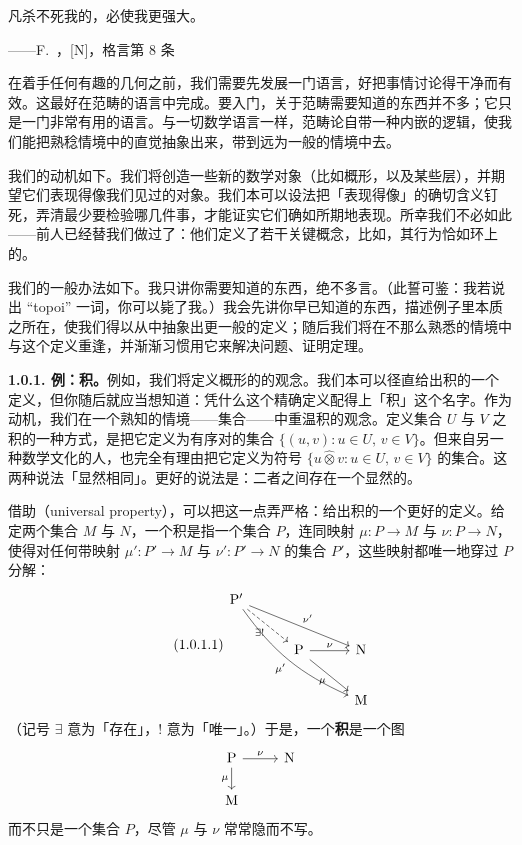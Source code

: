 \epigraph
  {凡杀不死我的，必使我更强大。}
  {——F.~\trNietzsche，[N]，格言第 8 条}

在着手任何有趣的几何之前，我们需要先发展一门语言，好把事情讨论得干净而有效。这最好在范畴的语言中完成。要入门，关于范畴需要知道的东西并不多；它只是一门非常有用的语言。与一切数学语言一样，范畴论自带一种内嵌的逻辑，使我们能把熟稔情境中的直觉抽象出来，带到远为一般的情境中去。

我们的动机如下。我们将创造一些新的数学对象（比如概形，以及某些层），并期望它们表现得像我们见过的对象。我们本可以设法把「表现得像」的确切含义钉死，弄清最少要检验哪几件事，才能证实它们确如所期地表现。所幸我们不必如此——前人已经替我们做过了：他们定义了若干关键概念，比如\trAbelianCategory，其行为恰如环上的\trModule。

我们的一般办法如下。我只讲你需要知道的东西，绝不多言。（此誓可鉴：我若说出 “topoi” 一词，你可以毙了我。）我会先讲你早已知道的东西，描述例子里本质之所在，使我们得以从中抽象出更一般的定义；随后我们将在不那么熟悉的情境中与这个定义重逢，并渐渐习惯用它来解决问题、证明定理。

\textbf{1.0.1. 例：积。}\quad 例如，我们将定义概形的\trProduct{}的观念。我们本可以径直给出积的一个定义，但你随后就应当想知道：凭什么这个精确定义配得上「积」这个名字。作为动机，我们在一个熟知的情境——集合——中重温积的观念。定义集合 $U$ 与 $V$ 之积的一种方式，是把它定义为有序对的集合
$\{(u,v):u\in U,\,v\in V\}$。但来自另一种数学文化的人，也完全有理由把它定义为符号 $\{u\mathbin{\hat{\otimes}}v:u\in U,\,v\in V\}$ 的集合。这两种说法「显然相同」。更好的说法是：二者之间存在一个显然的\trBijection。

借助\trUniversalProperty（universal property），可以把这一点弄严格：给出积的一个更好的定义。给定两个集合 $M$ 与 $N$，一个积是指一个集合 $P$，连同映射 $\mu\colon P\to M$ 与 $\nu\colon P\to N$，使得对任何带映射 $\mu'\colon P'\to M$ 与 $\nu'\colon P'\to N$ 的集合 $P'$，这些映射都唯一地穿过 $P$ 分解：
\begin{equation*}\tag{1.0.1.1}\label{eq:product-unique-decomposition}
\begin{tikzcd}[row sep=2.2em, column sep=2.8em]
\mathrm{P}' \ar[drr,"\nu'"] \ar[dr,dashed,"\exists!"'] \ar[ddrr,bend right=15,"\mu'"'] & & \\
 & \mathrm{P} \ar[r,"\nu"] \ar[dr,"\mu"'] & \mathrm{N} \\
 & & \mathrm{M}
\end{tikzcd}
\end{equation*}
（记号 $\exists$ 意为「存在」，$!$ 意为「唯一」。）于是，一个\textbf{积}是一个图
\[
\begin{tikzcd}[row sep=1.6em, column sep=2.4em]
\mathrm{P} \ar[r,"\nu"] \ar[d,"\mu"'] & \mathrm{N} \\
\mathrm{M} &
\end{tikzcd}
\]
而不只是一个集合 $P$，尽管 $\mu$ 与 $\nu$ 常常隐而不写。


